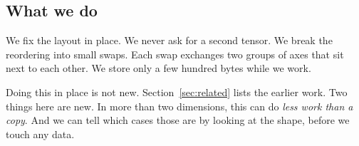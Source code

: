 \subsection{What we do}

We fix the layout in place. We never ask for a second tensor. We break the
reordering into small swaps. Each swap exchanges two groups of axes that sit
next to each other. We store only a few hundred bytes while we work.

Doing this in place is not new. Section~\ref{sec:related} lists the earlier
work. Two things here are new. In more than two dimensions, this can do
\emph{less work than a copy}. And we can tell which cases those are by looking
at the shape, before we touch any data.
